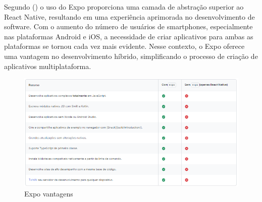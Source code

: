 Segundo (\textcite{Hugo}) o uso do Expo proporciona uma camada de abstração superior ao React Native, resultando em uma experiência aprimorada no desenvolvimento de software. Com o aumento do 
número de usuários de smartphones, especialmente nas plataformas Android e iOS, a necessidade de criar aplicativos para ambas as plataformas se tornou cada vez mais 
evidente. Nesse contexto, o Expo oferece uma vantagem no desenvolvimento híbrido, simplificando o processo de criação de aplicativos multiplataforma.


\begin{figure}[htb]
	\caption{\label{fig:Fig_1}Expo vantagens}
	\begin{center}
		\includegraphics{images/expo.png}
	\end{center}
\end{figure}